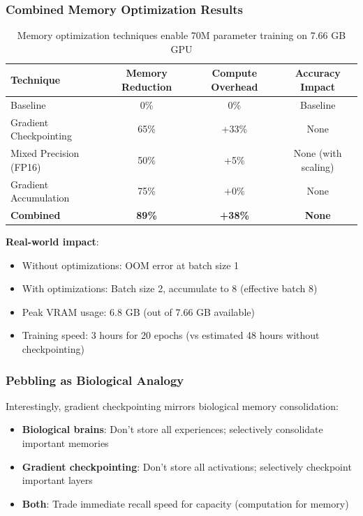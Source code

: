 \documentclass[12pt]{article}
\begin{document}
\subsubsection{Combined Memory Optimization Results}

\begin{table}[h]
\centering
\begin{tabular}{lccc}
\toprule
\textbf{Technique} & \textbf{Memory Reduction} & \textbf{Compute Overhead} & \textbf{Accuracy Impact} \\
\midrule
Baseline & 0\% & 0\% & Baseline \\
Gradient Checkpointing & 65\% & +33\% & None \\
Mixed Precision (FP16) & 50\% & +5\% & None (with scaling) \\
Gradient Accumulation & 75\% & +0\% & None \\
\midrule
\textbf{Combined} & \textbf{89\%} & \textbf{+38\%} & \textbf{None} \\
\bottomrule
\end{tabular}
\caption{Memory optimization techniques enable 70M parameter training on 7.66 GB GPU}
\end{table}

\textbf{Real-world impact}:
\begin{itemize}
\item Without optimizations: OOM error at batch size 1
\item With optimizations: Batch size 2, accumulate to 8 (effective batch 8)
\item Peak VRAM usage: 6.8 GB (out of 7.66 GB available)
\item Training speed: 3 hours for 20 epochs (vs estimated 48 hours without checkpointing)
\end{itemize}

\subsubsection{Pebbling as Biological Analogy}

Interestingly, gradient checkpointing mirrors biological memory consolidation:
\begin{itemize}
\item \textbf{Biological brains}: Don't store all experiences; selectively consolidate important memories
\item \textbf{Gradient checkpointing}: Don't store all activations; selectively checkpoint important layers
\item \textbf{Both}: Trade immediate recall speed for capacity (computation for memory)
\end{itemize}
\end{document}
